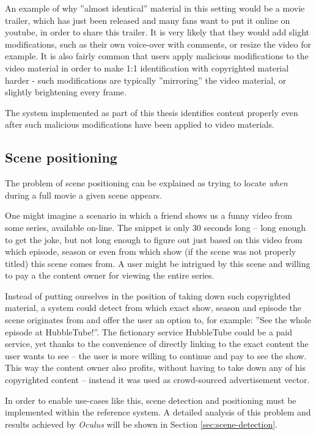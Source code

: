 An example of why ''almost identical'' material in this setting would be a movie trailer, which has just been released and many fans want to put it online on youtube, in order to share this trailer. It is very likely that they would add slight modifications, such as their own voice-over with comments, or resize the video for example. It is also fairly common that users apply malicious modifications to the video material in order to make 1:1 identification with copyrighted material harder - such modifications are typically ''mirroring'' the video material, or slightly brightening every frame. 

The system implemented as part of this thesis identifies content properly even after such malicious modifications have been applied to video materials.


\subsection{Scene positioning}
\label{sec:goal-sub-movie}
The problem of scene positioning can be explained as trying to locate \textit{when} during a full movie a given scene appears.

One might imagine a scenario in which a friend shows us a funny video from some series, available on-line. The snippet is only 30 seconds long -- long enough to get the joke, but not long enough to figure out just based on this video from which episode, season or even from which show (if the scene was not properly titled) this scene comes from. A user might be intrigued by this scene and willing to pay a the content owner for viewing the entire series. 

Instead of putting ourselves in the position of taking down such copyrighted material, a system could detect from which exact show, season and episode the scene originates from and offer the user an option to, for example: ''See the whole episode at HubbleTube!''. The fictionary service HubbleTube could be a paid service, yet thanks to the convenience of directly linking to the exact content the user wants to see -- the user is more willing to continue and pay to see the show. This way the content owner also profits, without having to take down any of his copyrighted content -- instead it was used as crowd-sourced advertisement vector.

In order to enable use-cases like this, scene detection and positioning must be implemented within the reference system. A detailed analysis of this problem and results achieved by \textit{Oculus} will be shown in Section \ref{sec:scene-detection}.



